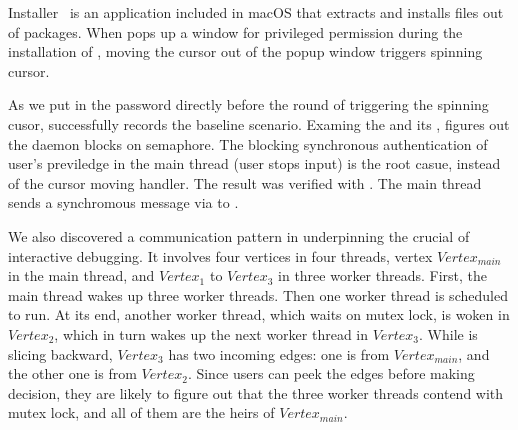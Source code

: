 Installer~\cite{Installer} is an application included in macOS that extracts and installs
files out of  packages. When  pops up a window for
privileged permission during the installation of ,
moving the cursor out of the popup window triggers spinning cursor.

As we put in the password directly before the round of triggering the
spinning cusor, \xxx successfully records the baseline scenario. Examing
the \spinningnode and its \similarnode, \xxx figures out the daemon
 blocks on semaphore. The blocking synchronous authentication
of user's previledge in the main thread (user stops input) is the root
casue, instead of the cursor moving handler. The result was verified with
. The main thread sends a synchromous message via  to .


We also discovered a communication pattern in  underpinning the
crucial of interactive debugging. It involves four vertices in four threads,
vertex $Vertex_{main}$ in the main thread, and $Vertex_1$ to $Vertex_3$ in
three worker threads. First, the main thread wakes up three worker threads.
Then one worker thread is scheduled to run. At its end, another worker thread,
which waits on mutex lock, is woken in $Vertex_2$, which in turn wakes up the
next worker thread in $Vertex_3$. While \xxx is slicing backward, $Vertex_3$
has two incoming edges: one is from $Vertex_{main}$, and the other one is from
$Vertex_2$. Since users can peek the edges before making decision, they are
likely to figure out that the three worker threads contend with mutex lock, and
all of them are the heirs of $Vertex_{main}$.
